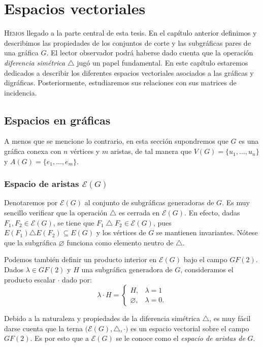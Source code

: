 \chapter{Espacios vectoriales}

\lettrine[lines=7] {\initfamily \selectfont H} {emos} llegado a la parte central de esta tesis. En el capítulo anterior definimos y describimos las propiedades de los conjuntos de corte y las subgráficas pares de una gráfica $G$. El lector observador podrá haberse dado cuenta que la operación \textit{diferencia simétrica} $\triangle$ jugó un papel fundamental. En este capítulo estaremos dedicados a describir los diferentes espacios vectoriales asociados a las gráficas y digráficas. Posteriormente, estudiaremos sus relaciones con sus matrices de incidencia.

\section{Espacios en gráficas}
A menos que se mencione lo contrario, en esta sección supondremos que $G$ es una gráfica conexa con $n$ vértices y $m$ aristas, de tal manera que $V(G)=\{u_{1}, \ldots, u_{n}\}$ y $A(G) = \{e_{1}, \ldots, e_{m}\}$.

\subsection{Espacio de aristas $\mathcal{E}(G)$}
Denotaremos por $\mathcal{E}(G)$ al conjunto de subgráficas generadoras de $G$.
Es muy sencillo verificar que la operación $\triangle$ es cerrada en $\mathcal{E}(G)$. En efecto, dadas $F_{1}, F_{2} \in \mathcal{E}(G)$, se tiene que  $F_{1} \bigtriangleup F_{2} \in \mathcal{E}(G)$, pues $E(F_{1}) \triangle E(F_{2}) \subseteq E(G)$ y los vértices de $G$ se mantienen invariantes. Nótese que la subgráfica $\varnothing$ funciona como elemento neutro de $\triangle$.

Podemos también definir un producto interior en $\mathcal{E}(G)$ bajo el campo $GF(2)$. Dados $\lambda \in GF(2)$ y $H$ una subgráfica generadora de $G$, consideramos el producto escalar $\cdot$ dado por:
$$
\lambda \cdot H =\left\{\begin{matrix}
H, & \lambda = 1  \\
\varnothing, & \lambda = 0.
\end{matrix}\right.
$$

    Debido a la naturaleza y propiedades de la diferencia simétrica $\triangle$, es muy fácil darse cuenta que la terna $\Big(\mathcal{E}(G), \triangle, \cdot\Big)$ es un espacio vectorial sobre el campo $GF(2)$. Es por esto que a $\mathcal{E}(G)$ se le conoce como el \textit{espacio de aristas de} $G$. 


